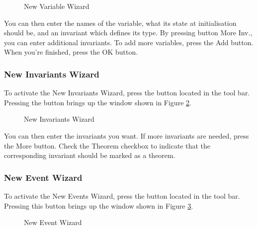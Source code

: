 \begin{figure}[!ht]
\begin{center}
	\caption{New Variable Wizard}
	\label{fig_ref_01_eventb_editor14}
\end{center}
\end{figure}

You can then enter the names of the variable, what its state at initialisation should be, and an invariant which defines its type. By pressing button \textsf{More Inv.}, you can enter additional invariants. To add more variables, press the \textsf{Add} button. When you're finished, press the \textsf{OK} button. 

\subsubsection{New Invariants Wizard}

To activate the \textsf{New Invariants Wizard}, press the  button located in the tool bar. Pressing the button brings up the window shown in Figure \ref{fig_ref_01_eventb_editor15}.

\begin{figure}[!ht]
\begin{center}
	\caption{New Invariants Wizard}
	\label{fig_ref_01_eventb_editor15}
\end{center}
\end{figure}

You can then enter the invariants you want. If more invariants are needed, press the \textsf{More} button. Check the \textsf{Theorem} checkbox to indicate that the corresponding invariant should be marked as a theorem.

\subsubsection{New Event Wizard}

To activate the \textsf{New Events Wizard}, press the  button located in the tool bar. Pressing this button brings up the window shown in Figure \ref{fig_ref_01_eventb_editor16}.

\begin{figure}[ht]
\begin{center}
	\caption{New Event Wizard}
	\label{fig_ref_01_eventb_editor16}
\end{center}
\end{figure}

